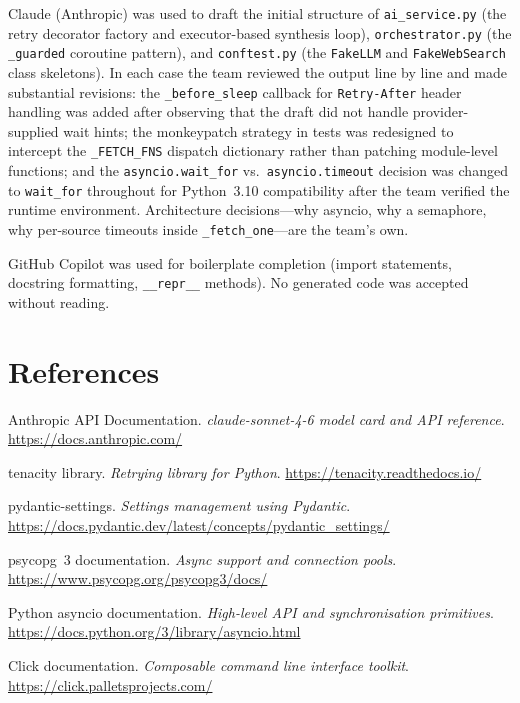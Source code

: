 \documentclass[11pt,a4paper]{article}
\begin{document}
Claude (Anthropic) was used to draft the initial structure of \texttt{ai\_service.py}
(the retry decorator factory and executor-based synthesis loop),
\texttt{orchestrator.py} (the \texttt{\_guarded} coroutine pattern), and
\texttt{conftest.py} (the \texttt{FakeLLM} and \texttt{FakeWebSearch} class skeletons).
In each case the team reviewed the output line by line and made substantial revisions:
the \texttt{\_before\_sleep} callback for \texttt{Retry-After} header handling was
added after observing that the draft did not handle provider-supplied wait hints; the
monkeypatch strategy in tests was redesigned to intercept the \texttt{\_FETCH\_FNS}
dispatch dictionary rather than patching module-level functions; and the
\texttt{asyncio.wait\_for} vs.\ \texttt{asyncio.timeout} decision was changed to
\texttt{wait\_for} throughout for Python~3.10 compatibility after the team verified
the runtime environment. Architecture decisions---why asyncio, why a semaphore, why
per-source timeouts inside \texttt{\_fetch\_one}---are the team's own.

GitHub Copilot was used for boilerplate completion (import statements, docstring
formatting, \texttt{\_\_repr\_\_} methods). No generated code was accepted without
reading.

\section*{References}

\begin{enumerate}[label={[\arabic*]},leftmargin=2.4em,itemsep=2pt]
  \item Anthropic API Documentation.
        \textit{claude-sonnet-4-6 model card and API reference}.
        \url{https://docs.anthropic.com/}
  \item tenacity library. \textit{Retrying library for Python}.
        \url{https://tenacity.readthedocs.io/}
  \item pydantic-settings. \textit{Settings management using Pydantic}.
        \url{https://docs.pydantic.dev/latest/concepts/pydantic_settings/}
  \item psycopg~3 documentation. \textit{Async support and connection pools}.
        \url{https://www.psycopg.org/psycopg3/docs/}
  \item Python asyncio documentation.
        \textit{High-level API and synchronisation primitives}.
        \url{https://docs.python.org/3/library/asyncio.html}
  \item Click documentation.
        \textit{Composable command line interface toolkit}.
        \url{https://click.palletsprojects.com/}
\end{enumerate}
\end{document}
